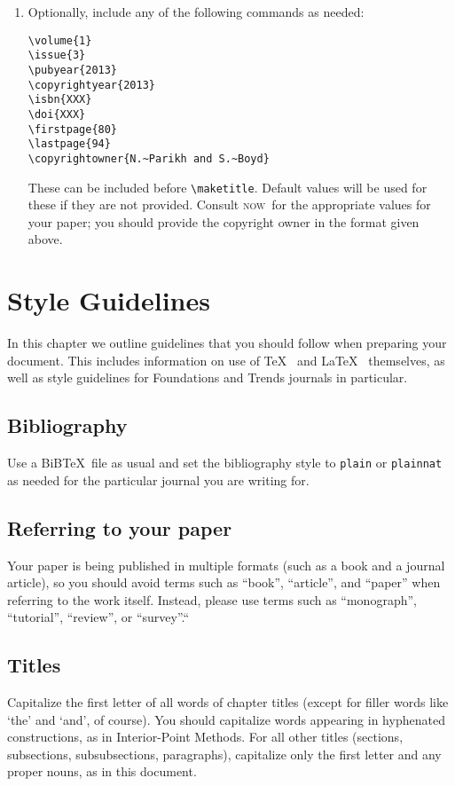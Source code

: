 \documentclass[openany]{now} %
\newcommand{\now}{\textsc{now}}
\begin{document}
\begin{enumerate}
\item Optionally, include any of the following commands as needed:

\begin{verbatim}
\volume{1}
\issue{3}
\pubyear{2013}
\copyrightyear{2013}
\isbn{XXX}
\doi{XXX}
\firstpage{80}
\lastpage{94}
\copyrightowner{N.~Parikh and S.~Boyd}
\end{verbatim}

These can be included before \texttt{\textbackslash maketitle}. Default values
will be used for these if they are not provided. Consult \now\ for the
appropriate values for your paper; you should provide the copyright owner in
the format given above.
\end{enumerate}

\chapter{Style Guidelines}

In this chapter we outline guidelines that you should follow when preparing
your document.  This includes information on use of \TeX\
\citep{KB:86} and \LaTeX\ \citep{Lam:94} themselves, as well as style guidelines
for Foundations and Trends journals in particular.

\section{Bibliography}

Use a BiB\TeX\ file as usual and set the bibliography style to
\texttt{plain} or \texttt{plainnat} as needed for the particular
journal you are writing for.

\section{Referring to your paper}

Your paper is being published in multiple formats (such as a book and a journal
article), so you should avoid terms such as ``book'', ``article'', and ``paper''
when referring to the work itself. Instead, please use terms such as ``monograph'',
``tutorial'', ``review'', or ``survey''.`` 

\section{Titles}

Capitalize the first letter of all words of chapter titles 
(except for filler words like `the' and `and', of course). 
You should capitalize words appearing in hyphenated constructions, as in
Interior-Point Methods.
For all other titles (sections, subsections, subsubsections, paragraphs),
capitalize only the first letter and any proper nouns, as in this document.
\end{document}
